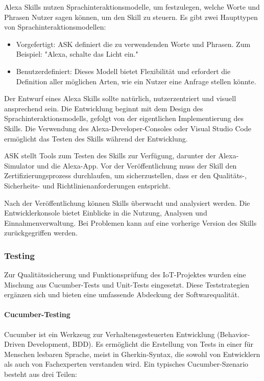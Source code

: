 Alexa Skills nutzen Sprachinteraktionsmodelle, um festzulegen, welche Worte und Phrasen Nutzer sagen können, um den Skill zu steuern. Es gibt zwei Haupttypen von Sprachinteraktionsmodellen:

\begin{itemize}
    \item Vorgefertigt: ASK definiert die zu verwendenden Worte und Phrasen. Zum Beispiel: "Alexa, schalte das Licht ein."
    \item Benutzerdefiniert: Dieses Modell bietet  Flexibilität und erfordert die Definition aller möglichen Arten, wie ein Nutzer eine Anfrage stellen könnte.
\end{itemize}

Der Entwurf eines Alexa Skills sollte natürlich, nutzerzentriert und visuell ansprechend sein. Die Entwicklung beginnt mit dem Design des Sprachinteraktionsmodells, gefolgt von der eigentlichen Implementierung des Skills. Die Verwendung des Alexa-Developer-Consoles oder Visual Studio Code ermöglicht das Testen des Skills während der Entwicklung.

ASK stellt Tools zum Testen des Skills zur Verfügung, darunter der Alexa-Simulator und die Alexa-App. Vor der Veröffentlichung muss der Skill den Zertifizierungsprozess durchlaufen, um sicherzustellen, dass er den Qualitäts-, Sicherheits- und Richtlinienanforderungen entspricht.

Nach der Veröffentlichung können Skills überwacht und analysiert werden. Die Entwicklerkonsole bietet Einblicke in die Nutzung, Analysen und Einnahmenverwaltung. Bei Problemen kann auf eine vorherige Version des Skills zurückgegriffen werden.

\subsubsection{Testing}
Zur Qualitätssicherung und Funktionsprüfung des IoT-Projektes wurden eine Mischung aus Cucumber-Tests und Unit-Tests eingesetzt. Diese Teststrategien ergänzen sich und bieten eine umfassende Abdeckung der Softwarequalität.

\paragraph{Cucumber-Testing}
Cucumber ist ein Werkzeug zur Verhaltensgesteuerten Entwicklung (Behavior-Driven Development, BDD). \cite{smartbear2019cucumber}Es ermöglicht die Erstellung von Tests in einer für Menschen lesbaren Sprache, meist in Gherkin-Syntax, die sowohl von Entwicklern als auch von Fachexperten verstanden wird. Ein typisches Cucumber-Szenario besteht aus drei Teilen:

